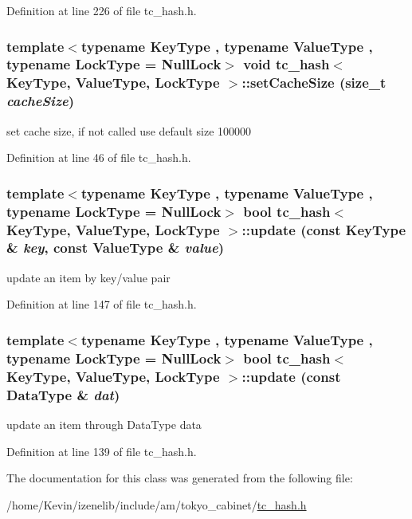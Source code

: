 Definition at line 226 of file tc\_\-hash.h.\hypertarget{classtc__hash_95514cd1ac7f01332038973d0c8db323}{
\subsubsection[{setCacheSize}]{\setlength{\rightskip}{0pt plus 5cm}template$<$typename KeyType , typename ValueType , typename LockType  = NullLock$>$ void {\bf tc\_\-hash}$<$ KeyType, ValueType, LockType $>$::setCacheSize (size\_\-t {\em cacheSize})}}
\label{classtc__hash_95514cd1ac7f01332038973d0c8db323}


set cache size, if not called use default size 100000 

Definition at line 46 of file tc\_\-hash.h.\hypertarget{classtc__hash_2aa23c6cb581dae26a9bf2f98e313f00}{
\subsubsection[{update}]{\setlength{\rightskip}{0pt plus 5cm}template$<$typename KeyType , typename ValueType , typename LockType  = NullLock$>$ bool {\bf tc\_\-hash}$<$ KeyType, ValueType, LockType $>$::update (const KeyType \& {\em key}, \/  const ValueType \& {\em value})}}
\label{classtc__hash_2aa23c6cb581dae26a9bf2f98e313f00}


update an item by key/value pair 

Definition at line 147 of file tc\_\-hash.h.\hypertarget{classtc__hash_d9f9b4ea4cf3424ca2112bb1ba9293f2}{
\subsubsection[{update}]{\setlength{\rightskip}{0pt plus 5cm}template$<$typename KeyType , typename ValueType , typename LockType  = NullLock$>$ bool {\bf tc\_\-hash}$<$ KeyType, ValueType, LockType $>$::update (const DataType \& {\em dat})}}
\label{classtc__hash_d9f9b4ea4cf3424ca2112bb1ba9293f2}


update an item through DataType data 

Definition at line 139 of file tc\_\-hash.h.

The documentation for this class was generated from the following file:\begin{CompactItemize}
\item 
/home/Kevin/izenelib/include/am/tokyo\_\-cabinet/\hyperlink{tc__hash_8h}{tc\_\-hash.h}\end{CompactItemize}
